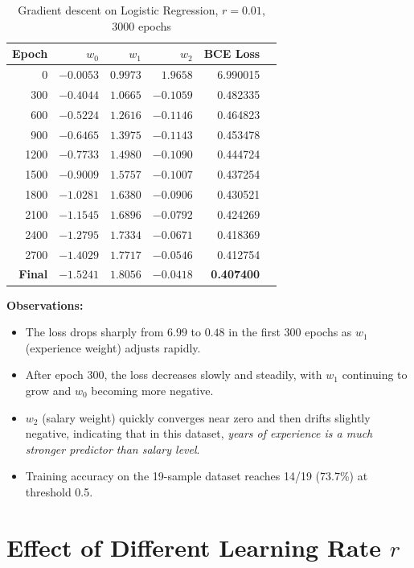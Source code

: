 \documentclass[12pt,a4paper]{article}
\begin{document}
\begin{table}[H]
\centering
\caption{Gradient descent on Logistic Regression, $r = 0.01$, 3000 epochs}
\begin{tabular}{rrrrrr}
\toprule
\textbf{Epoch} & $w_0$ & $w_1$ & $w_2$ & \textbf{BCE Loss} \\
\midrule
0    & $-0.0053$ & $0.9973$ & $1.9658$ & 6.990015 \\
300  & $-0.4044$ & $1.0665$ & $-0.1059$ & 0.482335 \\
600  & $-0.5224$ & $1.2616$ & $-0.1146$ & 0.464823 \\
900  & $-0.6465$ & $1.3975$ & $-0.1143$ & 0.453478 \\
1200 & $-0.7733$ & $1.4980$ & $-0.1090$ & 0.444724 \\
1500 & $-0.9009$ & $1.5757$ & $-0.1007$ & 0.437254 \\
1800 & $-1.0281$ & $1.6380$ & $-0.0906$ & 0.430521 \\
2100 & $-1.1545$ & $1.6896$ & $-0.0792$ & 0.424269 \\
2400 & $-1.2795$ & $1.7334$ & $-0.0671$ & 0.418369 \\
2700 & $-1.4029$ & $1.7717$ & $-0.0546$ & 0.412754 \\
\textbf{Final} & $-1.5241$ & $1.8056$ & $-0.0418$ & \textbf{0.407400} \\
\bottomrule
\end{tabular}
\end{table}

\noindent\textbf{Observations:}
\begin{itemize}
    \item The loss drops sharply from $6.99$ to $0.48$ in the first 300 epochs as $w_1$ (experience weight) adjusts rapidly.
    \item After epoch 300, the loss decreases slowly and steadily, with $w_1$ continuing to grow and $w_0$ becoming more negative.
    \item $w_2$ (salary weight) quickly converges near zero and then drifts slightly negative, indicating that in this dataset, \emph{years of experience is a much stronger predictor than salary level}.
    \item Training accuracy on the 19-sample dataset reaches 14/19 (73.7\%) at threshold 0.5.
\end{itemize}

\section{Effect of Different Learning Rate $r$}
\end{document}
